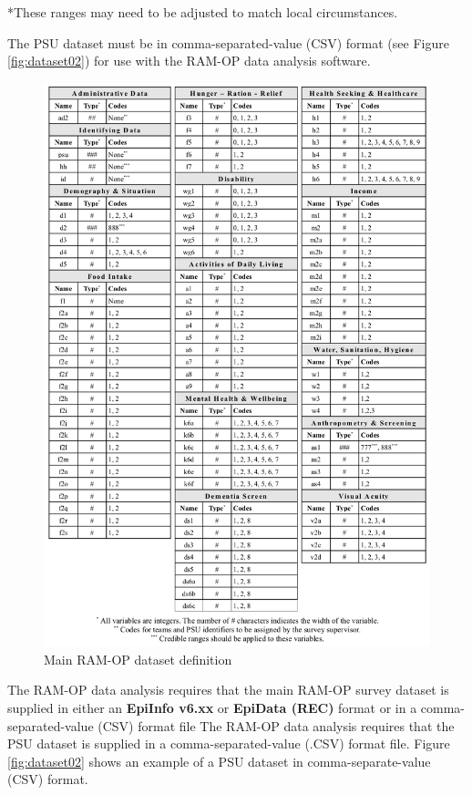 \documentclass[12pt,a4paper]{book}
\theoremstyle{definition}
\theoremstyle{definition}
\theoremstyle{definition}
\theoremstyle{remark}
\begin{document}
*These ranges may need to be adjusted to match local circumstances.

The PSU dataset must be in comma-separated-value (CSV) format (see
Figure \ref{fig:dataset02}) for use with the RAM-OP data analysis
software.

\begin{figure}[H]

{\centering \includegraphics{figures/dataset01} 

}

\caption{Main RAM-OP dataset definition}\label{fig:dataset01}
\end{figure}

The RAM-OP data analysis requires that the main RAM-OP survey dataset is
supplied in either an \textbf{EpiInfo v6.xx} or \textbf{EpiData (REC)}
format or in a comma-separated-value (CSV) format file The RAM-OP data
analysis requires that the PSU dataset is supplied in a
comma-separated-value (.CSV) format file. Figure \ref{fig:dataset02}
shows an example of a PSU dataset in comma-separate-value (CSV) format.
\end{document}
